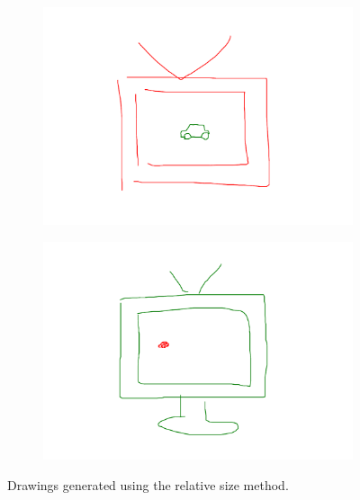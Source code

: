 \begin{figure}[ht]
        \begin{subfigure}{0.45\textwidth}
            \centering
            \includegraphics[width=\textwidth]{figures/car_on_tv_rel.pdf}
            \caption{\protect{}}
        \end{subfigure}
        \hfill
        \begin{subfigure}{0.45\textwidth}
            \centering
            \includegraphics[width=\textwidth]{figures/television_in_front_of_car.pdf}
            \caption{\protect{}}
        \end{subfigure}
    \caption[Drawings generated using the relative size method]{Drawings generated using the relative size method.}
    \label{fig:relative_size_examples}
\end{figure}


